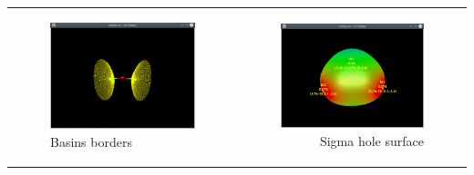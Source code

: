 \documentclass[10pt]{article}
\begin{document}
\hspace*{-5mm}
\begin{tabular}{lr}
\begin{minipage}{.5\linewidth}
    \begin{figure}[H]
        \begin{center}
            \includegraphics[width=0.8\linewidth]{damqt320_basins_display.png}
        \end{center}
        \vspace*{0.5mm}
        \caption{Basins borders \label{fig:4_13_9_4}}
    \end{figure}
\end{minipage}
&
\begin{minipage}{.5\linewidth}
    \begin{figure}[H]
        \begin{center}
            \includegraphics[width=0.8\linewidth]{damqt320_sgh_display.png} 
        \end{center}
        \vspace*{-0.5mm}
        \caption{Sigma hole surface \label{fig:4_13_9_5}}
    \end{figure}
\end{minipage}
\end{tabular}
\vspace*{5mm}
\end{document}
